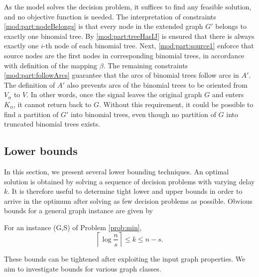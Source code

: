 As the model solves the decision problem, it suffices to find any feasible solution, and no objective function is needed.
The interpretation of constraints \eqref{mod:part:nodeBelongs} is that every node in the extended graph $G'$ belongs to exactly one binomial tree.
By \eqref{mod:part:treeHasIJ} is ensured that there is always exactly one $i$-th node of each binomial tree.
Next, \eqref{mod:part:source1} enforce that source nodes are the first nodes in corresponding binomial trees, in accordance with definition of the mapping $\beta$.
The remaining constraints \eqref{mod:part:followArcs} guarantee that the arcs of binomial trees follow arcs in $A'$.
The definition of $A'$ also prevents arcs of the binomial trees to be oriented from $V_\alpha$ to $V$.
In other words, once the signal leaves the original graph $G$ and enters $K_\alpha$, it cannot return back to $G$.
Without this requirement, it could be possible to find a partition of $G'$ into binomial trees, even though no partition of $G$ into truncated binomial trees exists.

\subsection{Lower bounds}
In this section, we present several lower bounding techniques. 
An optimal solution is obtained by solving a sequence of decision problems with varying delay $k$. 
It is therefore useful to determine tight lower and upper bounds in order to arrive in the optimum after solving as few decision problems as possible.
Obvious bounds for a general graph instance are given by
\begin{observation}
For an instance (G,S) of Problem \ref{prob:min},
$$\left\lceil\log\frac{n}{s}\right\rceil\leq k \leq n-s.$$
\end{observation}
These bounds can be tightened after exploiting the input graph properties. 
We aim to investigate bounds for various graph classes.



